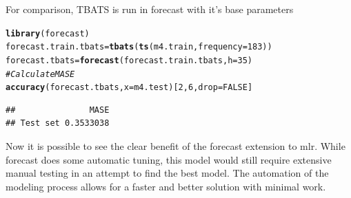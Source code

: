 \documentclass[12pt]{article}\usepackage[]{graphicx}\usepackage[]{color}
\makeatletter
\newcommand{\hlnum}[1]{\textcolor[rgb]{0.686,0.059,0.569}{#1}}%
\newcommand{\hlcom}[1]{\textcolor[rgb]{0.678,0.584,0.686}{\textit{#1}}}%
\newcommand{\hlstd}[1]{\textcolor[rgb]{0.345,0.345,0.345}{#1}}%
\newcommand{\hlkwb}[1]{\textcolor[rgb]{0.69,0.353,0.396}{#1}}%
\newcommand{\hlkwc}[1]{\textcolor[rgb]{0.333,0.667,0.333}{#1}}%
\newcommand{\hlkwd}[1]{\textcolor[rgb]{0.737,0.353,0.396}{\textbf{#1}}}%
\newenvironment{kframe}{%
 \def\at@end@of@kframe{}%
 \ifinner\ifhmode%
  \def\at@end@of@kframe{\end{minipage}}%
  \begin{minipage}{\columnwidth}%
 \fi\fi%
 \def\FrameCommand##1{\hskip\@totalleftmargin \hskip-\fboxsep
 \colorbox{shadecolor}{##1}\hskip-\fboxsep
     \hskip-\linewidth \hskip-\@totalleftmargin \hskip\columnwidth}%
 \MakeFramed {\advance\hsize-\width
   \@totalleftmargin\z@ \linewidth\hsize
   \@setminipage}}%
 {\par\unskip\endMakeFramed%
 \at@end@of@kframe}
\newenvironment{knitrout}{}{} %
\theoremstyle{definition}
\newcommand{\pkg}[1]{{\fontseries{b}\selectfont #1}}
\makeatother
\begin{document}
For comparison, TBATS is run in \pkg{forecast} with it's base parameters

\singlespacing
\begin{knitrout}
\color{fgcolor}\begin{kframe}
\begin{alltt}
\hlkwd{library}\hlstd{(forecast)}
\hlstd{forecast.train.tbats} \hlkwb{=} \hlkwd{tbats}\hlstd{(}\hlkwd{ts}\hlstd{(m4.train,}\hlkwc{frequency} \hlstd{=} \hlnum{183}\hlstd{))}
\hlstd{forecast.tbats} \hlkwb{=} \hlkwd{forecast}\hlstd{(forecast.train.tbats,}\hlkwc{h}\hlstd{=}\hlnum{35}\hlstd{)}
\hlcom{# Calculate MASE}
\hlkwd{accuracy}\hlstd{(forecast.tbats,} \hlkwc{x}\hlstd{= m4.test)[}\hlnum{2}\hlstd{,}\hlnum{6}\hlstd{,}\hlkwc{drop}\hlstd{=}\hlnum{FALSE}\hlstd{]}
\end{alltt}
\begin{verbatim}
##               MASE
## Test set 0.3533038
\end{verbatim}
\end{kframe}
\end{knitrout}
\doublespacing

Now it is possible to see the clear benefit of the forecast extension to \pkg{mlr}. While \pkg{forecast} does some automatic tuning, this model would still require extensive manual testing in an attempt to find the best model. The automation of the modeling process allows for a faster and better solution with minimal work.

\begin{knitrout}
\color{fgcolor}\begin{kframe}


{\ttfamily\noindent\bfseries\color{errorcolor}{\#\# Error in cbind(climate.pred\$data, as.data.frame(forecast.tbats\$mean)): object 'climate.pred' not found}}

{\ttfamily\noindent\bfseries{}}\end{kframe}
\end{knitrout}
\end{document}
